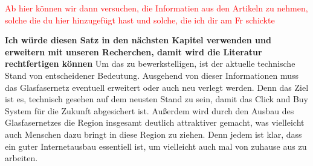 \textcolor{red}{Ab hier können wir dann versuchen, die Informatien aus den Artikeln zu nehmen, solche
die du hier hinzugefügt hast und solche, die ich dir am Fr schickte}










\textbf{Ich würde diesen Satz in den nächsten Kapitel verwenden und erweitern mit unseren Recherchen, damit wird 
die Literatur rechtfertigen können}
Um das zu bewerkstelligen, ist der aktuelle technische Stand von entscheidener Bedeutung. 
Ausgehend von dieser Informationen muss das Glasfasernetz eventuell erweitert oder auch neu verlegt werden.
Denn das Ziel ist es, technisch gesehen auf dem neusten Stand zu sein, damit das Click and Buy System für die Zukunft abgesichert ist.
Außerdem wird durch den Ausbau des Glasfasernetzes die Region insgesamt deutlich attraktiver gemacht, was vielleicht auch Menschen dazu bringt
in diese Region zu ziehen. Denn jedem ist klar, dass ein guter Internetausbau essentiell ist, um vielleicht auch mal von zuhause aus zu arbeiten.













